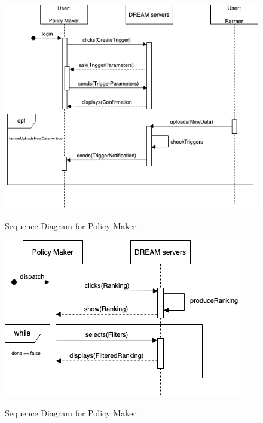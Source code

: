 \begin{figure}[hbt!]
\centering
\includegraphics[scale=0.6]{Files/sequence_disgrams/thePNGs/policy_setTrigger.png}\\
\caption{\label{tab:addOne{figure_counter}}Sequence Diagram for Policy Maker.}
\end{figure}

\begin{figure}[hbt!]
\centering
\includegraphics[scale=0.6]{Files/sequence_disgrams/thePNGs/policy_viewRanking.png}\\
\caption{\label{tab:addOne{figure_counter}}Sequence Diagram for Policy Maker.}
\end{figure}



%

